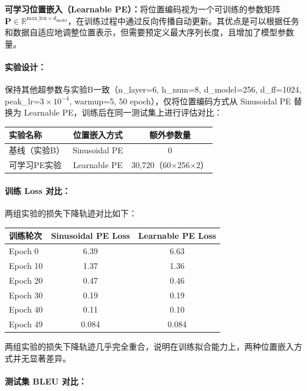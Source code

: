 \documentclass[11pt,a4paper]{article}
\begin{document}
\textbf{可学习位置嵌入（Learnable PE）：}将位置编码视为一个可训练的参数矩阵 $\mathbf{P} \in \mathbb{R}^{\text{max\_len} \times d_{\text{model}}}$，在训练过程中通过反向传播自动更新。其优点是可以根据任务和数据自适应地调整位置表示，但需要预定义最大序列长度，且增加了模型参数量。

\paragraph{实验设计：}
保持其他超参数与实验B一致（n\_layer=6, h\_num=8, d\_model=256, d\_ff=1024, peak\_lr=$3\times 10^{-4}$, warmup=5, 50 epoch），仅将位置编码方式从 Sinusoidal PE 替换为 Learnable PE，训练后在同一测试集上进行评估对比：

\begin{table}[h]
\centering
\begin{tabular}{lcc}
\toprule
实验名称 & 位置嵌入方式 & 额外参数量 \\
\midrule
基线（实验B） & Sinusoidal PE & 0 \\
可学习PE实验 & Learnable PE & 30,720（60$\times$256$\times$2） \\
\bottomrule
\end{tabular}
\end{table}

\paragraph{训练 Loss 对比：}
两组实验的损失下降轨迹对比如下：

\begin{table}[h]
\centering
\begin{tabular}{lcc}
\toprule
训练轮次 & Sinusoidal PE Loss & Learnable PE Loss \\
\midrule
Epoch 0 & 6.39 & 6.63 \\
Epoch 10 & 1.37 & 1.36 \\
Epoch 20 & 0.47 & 0.46 \\
Epoch 30 & 0.19 & 0.19 \\
Epoch 40 & 0.11 & 0.10 \\
Epoch 49 & 0.084 & 0.084 \\
\bottomrule
\end{tabular}
\end{table}

两组实验的损失下降轨迹几乎完全重合，说明在训练拟合能力上，两种位置嵌入方式并无显著差异。

\paragraph{测试集 BLEU 对比：}
\end{document}
